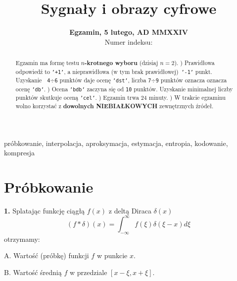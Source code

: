 \documentclass[journal,9pt,final,a4paper]{IEEEtran}%
\begin{document}
\title{Sygna\l y i obrazy cyfrowe}
\author{\textbf{Egzamin, 5 lutego, AD MMXXIV}\vspace*{5mm}\\Numer indeksu:
\begin{tabular}
[c]{|l|l|l|l|l|l|}\hline
&  &  &  &  & \\\hline
\end{tabular}
}
\maketitle

\begin{abstract}
Egzamin ma form\k{e} testu $n$\textbf{-krotnego wyboru} (dzisiaj $n=2$).
) Prawid\l owa odpowied\'{z} to \texttt{'+1'}, a nieprawid\l owa (w
tym brak prawid\l owej)\ \texttt{'-1'} punkt. Uzyskanie\textbf{\ }%
\texttt{4}$\mathbf{\div}$\texttt{6} punkt\'{o}w daje ocen\k{e} \texttt{'dst'},
liczba \texttt{7}$\mathbf{\div}$\texttt{9} punkt\'{o}w oznacza oznacza
ocen\k{e} \texttt{'db'}. ) Ocena \texttt{'bdb'} zaczyna si\k{e} od
\texttt{10} punkt\'{o}w. Uzyskanie minimalnej liczby punkt\'{o}w skutkuje
ocen\k{a} \texttt{'cel'}. ) Egzamin trwa 24 minuty. ) W
trakcie egzaminu wolno korzysta\'{c} z \textbf{dowolnych NIEBIA\L KOWYCH}
zewn\k{e}trznych \'{z}r\'{o}de\l .

\end{abstract}

\begin{IEEEkeywords}
pr\'{o}bkowanie, interpolacja, aproksymacja, estymacja, entropia, kodowanie, kompresja
\end{IEEEkeywords}

\section{Pr\'{o}bkowanie}

\textbf{1. }Splataj\k{a}c funkcj\k{e} ci\k{a}g\l \k{a} $f\left(  x\right)  $ z
delt\k{a} Diraca $\delta\left(  x\right)  $%
\[
\left(  f\ast\delta\right)  \left(  x\right)  =\int_{-\infty}^{\infty}f\left(
\xi\right)  \delta\left(  \xi-x\right)  d\xi
\]
otrzymamy:

A. Warto\'{s}\'{c} (pr\'{o}bk\k{e}) funkcji $f$ w punkcie $x$.

B. Warto\'{s}\'{c} \'{s}redni\k{a} $f$ w przedziale $\left[  x-\xi
,x+\xi\right]  $.
\end{document}
